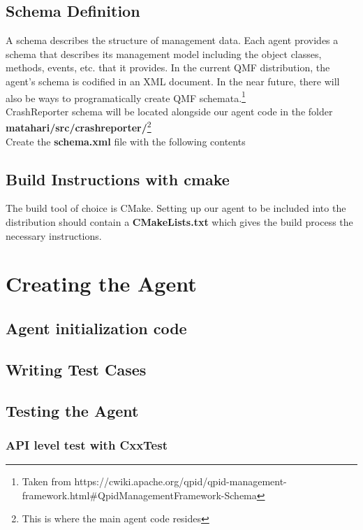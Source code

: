 \documentclass[a4paper,12pt]{article}
\begin{document}
\subsection{Schema Definition}
A schema describes the structure of management data. Each agent provides a 
schema that describes its management model including the object classes, 
methods, events, etc. that it provides. In the current QMF distribution, the 
agent's schema is codified in an XML document. In the near future, there will 
also be ways to programatically create QMF schemata.\footnote{Taken from 
https://cwiki.apache.org/qpid/qpid-management-framework.html\#QpidManagementFramework-Schema}\\

CrashReporter schema will be located alongside our agent code in the folder
\textbf{matahari/src/crashreporter/}\footnote{This is where the main agent code
resides}\\

Create the \textbf{schema.xml} file with the following contents


\subsection{Build Instructions with cmake}
The build tool of choice is CMake. Setting up our agent to be included into the distribution
should contain a \textbf{CMakeLists.txt} which gives the build process the necessary
instructions.


\newpage
\section{Creating the Agent}
\subsection{Agent initialization code}

\subsection{Writing Test Cases}
\subsection{Testing the Agent}
\subsubsection{API level test with CxxTest}
\end{document}
